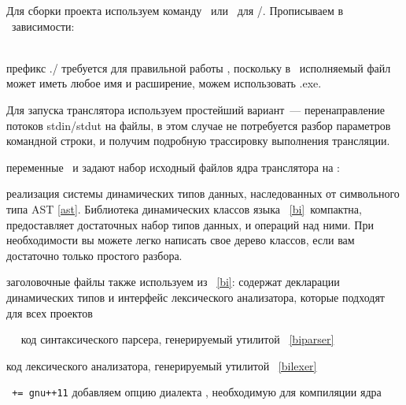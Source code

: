\label{bimake}

Для сборки проекта используем команду \ или \ для
\win/\mingw. Прописываем в \ зависимости:


\begin{description}

\item{}\\ префикс ./ требуется для правильной работы
, поскольку в \linux\ исполняемый файл может иметь любое имя и
расширение, можем использовать .exe.

Для запуска транслятора используем простейший вариант\ --- перенаправление
потоков stdin/stdut на файлы, в этом случае не потребуется разбор параметров
командной строки, и получим подробную трассировку выполнения трансляции.

\item{переменные \ и } задают набор исходный файлов ядра
транслятора на \cpp:

\begin{description}
\item{} реализация системы динамических типов данных,
наследованных от символьного типа AST \ref{ast}. Библиотека динамических классов
языка \bi\ \ref{bi}\ компактна, предоставляет достаточных набор типов
данных, и операций над ними. При необходимости вы можете легко написать свое
дерево классов, если вам достаточно только простого разбора.
\item{} заголовочные файлы также используем из \bi\ \ref{bi}:
содержат декларации динамических типов и интерфейс лексического анализатора,
которые подходят для всех проектов
\item{\ } \cpp\ код синтаксического парсера,
генерируемый утилитой \ \ref{biparser}
\item{} код лексического анализатора, генерируемый утилитой
\ \ref{bilexer}
\item{\verb| += gnu++11|} добавляем опцию диалекта \cpp,
необходимую для компиляции ядра \bi
\end{description}

\end{description}
